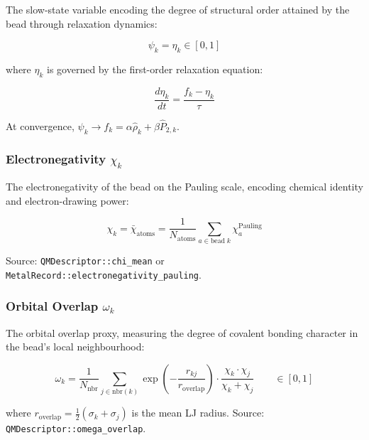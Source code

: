 \documentclass[11pt, a4paper, oneside]{article}
\newcommand{\field}[1]{\texttt{#1}}
\begin{document}
The slow-state variable encoding the degree of structural order
attained by the bead through relaxation dynamics:

\begin{equation}
\psi_k = \eta_k \in [0, 1]
\label{eq:psi}
\end{equation}

where $\eta_k$ is governed by the first-order relaxation equation:

\begin{equation}
\frac{d\eta_k}{dt} = \frac{f_k - \eta_k}{\tau}
\label{eq:eta_ode}
\end{equation}

At convergence, $\psi_k \to f_k = \alpha\hat\rho_k + \beta\hat P_{2,k}$.

\subsubsection{Electronegativity
  \texorpdfstring{$\chi_k$}{χ\_k}}

The electronegativity of the bead on the Pauling scale, encoding
chemical identity and electron-drawing power:

\begin{equation}
\chi_k = \bar\chi_{\mathrm{atoms}} = \frac{1}{N_{\mathrm{atoms}}}
  \sum_{a \in \mathrm{bead}\;k} \chi_a^{\mathrm{Pauling}}
\label{eq:chi}
\end{equation}

Source: \field{QMDescriptor::chi\_mean} or
\field{MetalRecord::electronegativity\_pauling}.

\subsubsection{Orbital Overlap
  \texorpdfstring{$\omega_k$}{ω\_k}}

The orbital overlap proxy, measuring the degree of covalent bonding
character in the bead's local neighbourhood:

\begin{equation}
\omega_k = \frac{1}{N_{\mathrm{nbr}}}
  \sum_{j \in \mathrm{nbr}(k)}
  \exp\!\left(-\frac{r_{kj}}{r_{\mathrm{overlap}}}\right)
  \cdot \frac{\chi_k \cdot \chi_j}{\chi_k + \chi_j}
\qquad \in [0, 1]
\label{eq:omega}
\end{equation}

where $r_{\mathrm{overlap}} = \frac{1}{2}(\sigma_k + \sigma_j)$ is the
mean LJ radius.
Source: \field{QMDescriptor::omega\_overlap}.
\end{document}
